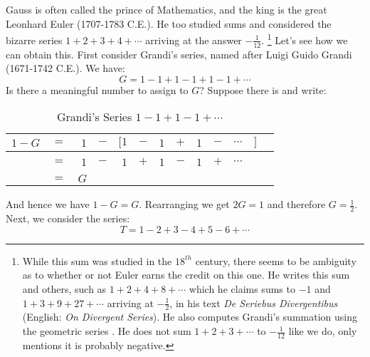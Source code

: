     \begin{example}
        \label{ex:Logic_Euler_Sum}%
        Gauss is often called the prince of Mathematics, and the king is the
        great Leonhard Euler (1707-1783 C.E.). He too
        studied sums and considered the bizarre series $1+2+3+4+\cdots$ arriving
        at the answer $\minus\frac{1}{12}$.%
        \footnote{%
            While this sum was studied in the $18^{th}$ century, there seems to
            be ambiguity as to whether or not Euler earns the credit on this
            one. He writes this sum and others, such as $1+2+4+8+\cdots$ which
            he claims sums to $\minus{1}$ and $1+3+9+27+\cdots$ arriving at
            $\minus\frac{1}{2}$, in his text \textit{De Seriebus Divergentibus}
            (English: \textit{On Divergent Series}). He also computes Grandi's
            summation using the geometric series
            \cite[p.~206-208]{euler2012seriebus}. He does not sum $1+2+3+\cdots$
            to $\minus\frac{1}{12}$ like we do, only mentions it is probably
            negative.
        }
        Let's see how we can obtain this. First consider Grandi's
        series, named after Luigi Guido Grandi%
         (1671-1742 C.E.). We have:
        \begin{equation}
            G=1-1+1-1+1-1+\cdots
        \end{equation}
        Is there a meaningful number to assign to $G$? Suppose there is and
        write:
        \begin{table}[H]
            \centering
            \captionsetup{type=table}
            \begin{tabular}{rrrrrrrrrrrrr}
                $1-G$&$=$&$1$&$-$&$\Big[$$1$&$-$&$1$&$+$&$1$&$-$&$\cdots$
                    &$\Big]$\\[1ex]
                \hline\\
                    &$=$&$1$&$-$&$1$&$+$&$1$&$-$&$1$&$+$&$\cdots$\\[1ex]
                \hline\\
                &$=$&$G$
            \end{tabular}
            \caption{Grandi's Series $1-1+1-1+\cdots$}
        \end{table}
        And hence we have $1-G=G$. Rearranging we get $2G=1$ and therefore
        $G=\frac{1}{2}$. Next, we consider the series:
        \begin{equation}
            T=1-2+3-4+5-6+\cdots
        \end{equation}

\end{example}
